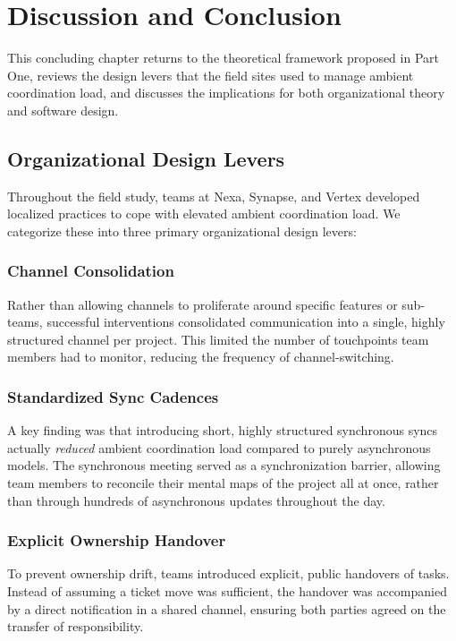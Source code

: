 \chapter{Discussion and Conclusion}
\label{ch:conclusion}

This concluding chapter returns to the theoretical framework proposed in Part One, reviews the design levers that the field sites used to manage ambient coordination load, and discusses the implications for both organizational theory and software design.

\section{Organizational Design Levers}

Throughout the field study, teams at Nexa, Synapse, and Vertex developed localized practices to cope with elevated ambient coordination load. We categorize these into three primary organizational design levers:

\subsection{Channel Consolidation}
Rather than allowing channels to proliferate around specific features or sub-teams, successful interventions consolidated communication into a single, highly structured channel per project. This limited the number of touchpoints team members had to monitor, reducing the frequency of channel-switching.

\subsection{Standardized Sync Cadences}
A key finding was that introducing short, highly structured synchronous syncs actually \emph{reduced} ambient coordination load compared to purely asynchronous models. The synchronous meeting served as a synchronization barrier, allowing team members to reconcile their mental maps of the project all at once, rather than through hundreds of asynchronous updates throughout the day.

\subsection{Explicit Ownership Handover}
To prevent ownership drift, teams introduced explicit, public handovers of tasks. Instead of assuming a ticket move was sufficient, the handover was accompanied by a direct notification in a shared channel, ensuring both parties agreed on the transfer of responsibility.

